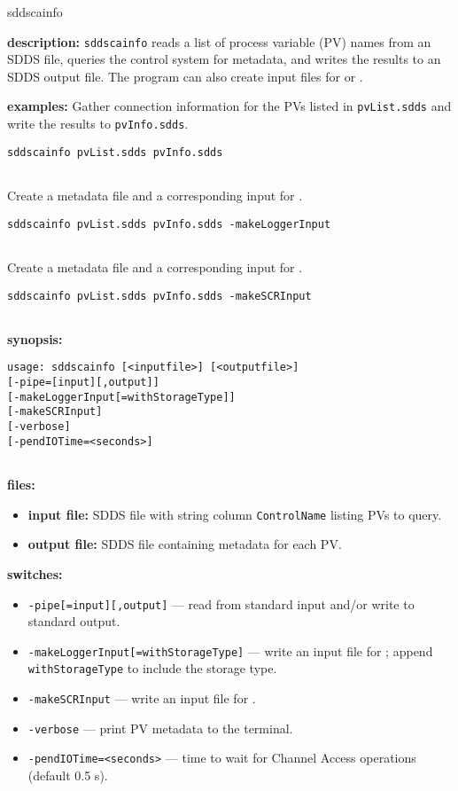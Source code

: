 %
%
\begin{sddsprog}{sddscainfo}
\item \textbf{description:}
  \verb+sddscainfo+ reads a list of process variable (PV) names from an SDDS file,
  queries the control system for metadata, and writes the results to an SDDS output file.
  The program can also create input files for  or .

\item \textbf{examples:}
  Gather connection information for the PVs listed in \verb+pvList.sdds+ and write the results to \verb+pvInfo.sdds+.
  \begin{verbatim}
sddscainfo pvList.sdds pvInfo.sdds
  
\end{verbatim}
  Create a metadata file and a corresponding input for .
  \begin{verbatim}
sddscainfo pvList.sdds pvInfo.sdds -makeLoggerInput
  
\end{verbatim}
  Create a metadata file and a corresponding input for .
  \begin{verbatim}
sddscainfo pvList.sdds pvInfo.sdds -makeSCRInput
  
\end{verbatim}

\item \textbf{synopsis:}
  \begin{verbatim}
usage: sddscainfo [<inputfile>] [<outputfile>]
[-pipe=[input][,output]]
[-makeLoggerInput[=withStorageType]]
[-makeSCRInput]
[-verbose]
[-pendIOTime=<seconds>]
  
\end{verbatim}

\item \textbf{files:}
\begin{itemize}
  \item \textbf{input file:} SDDS file with string column \verb|ControlName| listing PVs to query.
  \item \textbf{output file:} SDDS file containing metadata for each PV.
\end{itemize}

\item \textbf{switches:}
\begin{itemize}
  \item {\tt -pipe[=input][,output]} --- read from standard input and/or write to standard output.
  \item {\tt -makeLoggerInput[=withStorageType]} --- write an input file for ; append \newline
    \verb|withStorageType| to include the storage type.
  \item {\tt -makeSCRInput} --- write an input file for .
  \item {\tt -verbose} --- print PV metadata to the terminal.
  \item {\tt -pendIOTime=<seconds>} --- time to wait for Channel Access operations (default 0.5 s).
\end{itemize}


\end{sddsprog}

